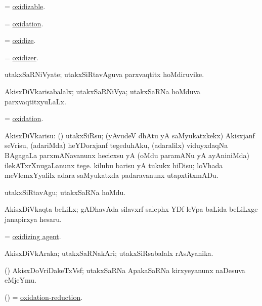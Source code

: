 \bentry
{}
\gl{\gu}
\bmng
= \hyperlink{oxidizable}{oxidizable}. 
\emng
\eentry

\bentry
{}
\gl{\nA}
\bmng
= \hyperlink{oxidation}{oxidation}. 
\emng
\eentry

\bentry
{}
\gl{\kirx}
\bmng
= \hyperlink{oxidize}{oxidize}. 
\emng
\eentry

\bentry
{}
\gl{\nA}
\bmng
= \hyperlink{oxidizer}{oxidizer}. 
\emng
\eentry

\bentry
{}
\gl{\nA}
\bmng
utakxSaRNiVyate; utakxSiRtavAguva parxvaqtitx hoMdiruvike. 
\emng
\eentry

\bentry
{}
\gl{\gu}
\bmng
AkisxDiVkarisabalalx; utakxSaRNiVya; utakxSaRNa hoMduva parxvaqtitxyuLaLx. 
\emng
\eentry

\bentry
{}
\gl{\nA}
\bmng
= \hyperlink{oxidation}{oxidation}. 
\emng
\eentry

\bentry
{}
\gl{\sakirx}
\bmng
AkisxDiVkarisu: 
\banum
{} (\ravi) utakxSiRsu; (yAvudeV dhAtu yA saMyukatxkekx) Akisxjanf seVrisu, (adariMda) heYDorxjanf tegeduhAku, (adaralilx) viduyxdaqNa BAgagaLa parxmANavanunx hecicxsu yA (oMdu paramANu yA ayAniniMda) ilekATxrXnugaLanunx tege. 
 kilubu barisu yA tukukx hiDisu; loVhada meVlemxYyalilx adara saMyukatxda padaravanunx utapxtitxmADu. 
\eanum
\emng

\noindent
\gl{\akirx}
\bmng
utakxSiRtavAgu; utakxSaRNa hoMdu. 
\emng
\eentry

\bentry
{}
\gl{\nA}
\bmng
AkisxDiVkaqta beLiLx; gADhavAda silavxrf salephx YDf leVpa baLida beLiLxge janapirxya hesaru. 
\emng
\eentry

\bentry
{}
\gl{\nA}
\bmng
= \hyperlink{oxidizing agent}{oxidizing agent}. 
\emng
\eentry

\bentry
{}
\gl{\nA}
\bmng
AkisxDiVkAraka; utakxSaRNakAri; utakxSiRsabalalx rAsAyanika. 
\emng
\eentry

\bentry
{}
\gl{\nA}
\bmng
(\jiVra) AkisxDoVriDakeTxVsf; utakxSaRNa ApakaSaRNa kirxyeyanunx naDesuva eMjeYmu. 
\emng
\eentry

\bentry
{}
\gl{\nA}
\bmng
(\ravi) = \hyperlink{oxidation-reduction}{oxidation-reduction}. 
\emng
\eentry

